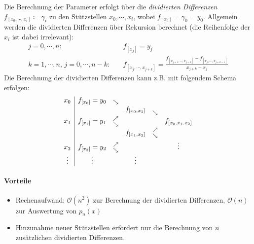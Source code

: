             Die Berechnung der Parameter erfolgt über die \textit{dividierten Differenzen} \( f_{[x_0, \cdots, x_i]} \coloneqq \gamma_i \) zu den Stützstellen \( x_0, \cdots, x_i \), wobei \( f_{[x_0]} = \gamma_0 = y_0 \). Allgemein werden die dividierten Differenzen über Rekursion berechnet (die Reihenfolge der \(x_i\) ist dabei irrelevant):
            \begin{align*}
	            j = 0, \cdots, n: &\quad f_{[x_j]} = y_j \\
	            k = 1, \cdots, n,\, j = 0, \cdots, n - k: &\quad f_{[x_j, \cdots, x_{j+k}]} = \frac{f_{[x_{j + 1}, \cdots, x_{j+k}]} - f_{[x_j, \cdots, x_{j+k-1}]}}{{x_{j+k} - x_j}}
            \end{align*}
            Die Berechnung der dividierten Differenzen kann z.B. mit folgendem Schema erfolgen:
            \begin{equation*}
	            \begin{array}{c | ccccc}
	            	 x_0   & f_{[x_0]} = y_0 &           \raisebox{-4pt}{\( \overset{\searrow}{} \)}           &  \\
	            	       &                 &                                                                 & f_{[x_0, x_1]} &           \raisebox{-7pt}{\( \overset{\searrow}{} \)}           &  \\
	            	 x_1   & f_{[x_1]} = y_1 & \raisebox{-6pt}{\( \overset{\nearrow}{\overset{\searrow}{}} \)} &                &                                                                 & f_{[x_0, x_1, x_2]} \\
	            	       &                 &                                                                 & f_{[x_1, x_2]} & \raisebox{-6pt}{\( \overset{\nearrow}{\overset{\searrow}{}} \)} &  \\
	            	 x_2   & f_{[x_2]} = y_2 & \raisebox{-6pt}{\( \overset{\nearrow}{\overset{\searrow}{}} \)} &                &                                                                 &       \vdots        \\
	            	\vdots & \vdots          &                                                                 &     \vdots     &
	            \end{array}
            \end{equation*}
            
            \paragraph{Vorteile}
	            \begin{itemize}
	            	\item Rechenaufwand: \( \mathcal{O}(n^2) \) zur Berechnung der dividierten Differenzen, \( \mathcal{O}(n) \) zur Auswertung von \( p_n(x) \)
	            	\item Hinzunahme neuer Stützstellen erfordert nur die Berechnung von \(n\) zusätzlichen dividierten Differenzen.
	            \end{itemize}

